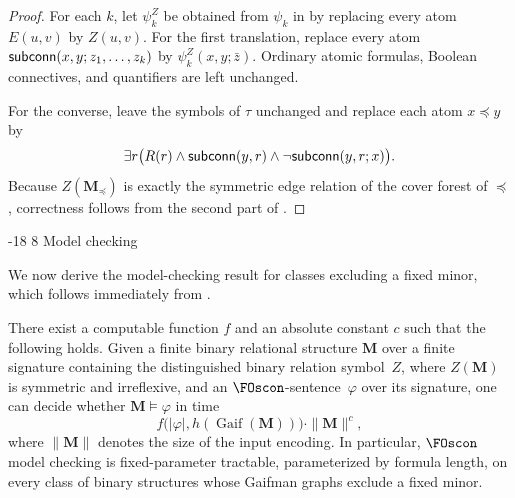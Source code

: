\documentclass[1p,number,11pt]{elsarticle}
\makeatletter
\renewcommand\subsection{\@startsection{subsection}{2}{\z@}%
  {-18\p@ \@plus -4\p@ \@minus -4\p@}%
  {8\p@ \@plus 4\p@ \@minus 4\p@}%
  {\normalfont\normalsize\bfseries}}
\newcommand{\scon}{\hbox{\sf subconn}}
\newcommand{\Gaif}{\operatorname{Gaif}}
\theoremstyle{plain}
\makeatother
\begin{document}
\begin{proof}
For each $k$, let $\psi_k^Z$ be obtained from $\psi_k$ in
 by replacing every atom $E(u,v)$ by $Z(u,v)$.
For the first translation, replace every atom
$\scon(x,y;z_1,\ldots,z_k)$ by $\psi_k^Z(x,y;\bar z)$. Ordinary
atomic formulas, Boolean connectives, and quantifiers are left unchanged.

For the converse, leave the symbols of $\tau$ unchanged and replace each
atom $x\preceq y$ by
\[
   \exists r\bigl(
      R(r)
      \wedge \scon(y,r)
      \wedge \neg\scon(y,r;x)
   \bigr).
\]
Because $Z(\mathbf M_\preceq)$ is exactly the symmetric edge relation of the
cover forest of $\preceq$, correctness follows from the second part of
.
\end{proof}

\subsection{Model checking}\label{sec-MC}

We now derive the model-checking result for classes excluding a fixed minor, which follows immediately from .

\begin{theorem}[store=thm:main-mc,
    restate-keys={note=see \zcpageref[nocap]{thm:main-mc}}]
There exist a computable function $f$ and an absolute constant $c$ such that
the following holds. Given a finite binary relational structure $\mathbf M$
over a finite signature containing the distinguished binary relation
symbol~$Z$, where $Z(\mathbf M)$ is symmetric and irreflexive, and an
$\FOscon$-sentence~$\varphi$ over its signature, one can decide whether
$\mathbf M\models\varphi$ in time
\[
   f\bigl(|\varphi|,h(\Gaif(\mathbf M))\bigr)\cdot\|\mathbf M\|^c,
\]
where $\|\mathbf M\|$ denotes the size of the input encoding. In particular,
$\FOscon$ model checking is fixed-parameter tractable, parameterized by formula length, on every class of binary structures whose Gaifman graphs exclude a
fixed minor.
\end{theorem}
\end{document}
